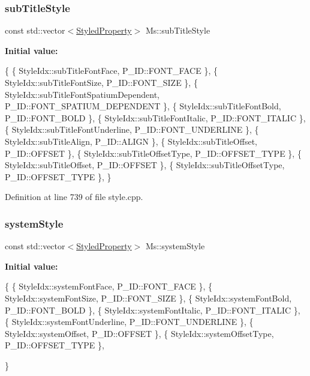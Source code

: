 \subsubsection{\texorpdfstring{sub\+Title\+Style}{subTitleStyle}}
{\footnotesize\ttfamily const std\+::vector$<$\hyperlink{struct_ms_1_1_styled_property}{Styled\+Property}$>$ Ms\+::sub\+Title\+Style}

{\bfseries Initial value\+:}
\begin{DoxyCode}
\{
      \{ StyleIdx::subTitleFontFace,                   P\_ID::FONT\_FACE              \},
      \{ StyleIdx::subTitleFontSize,                   P\_ID::FONT\_SIZE              \},
      \{ StyleIdx::subTitleFontSpatiumDependent,       P\_ID::FONT\_SPATIUM\_DEPENDENT \},
      \{ StyleIdx::subTitleFontBold,                   P\_ID::FONT\_BOLD              \},
      \{ StyleIdx::subTitleFontItalic,                 P\_ID::FONT\_ITALIC            \},
      \{ StyleIdx::subTitleFontUnderline,              P\_ID::FONT\_UNDERLINE         \},
      \{ StyleIdx::subTitleAlign,                      P\_ID::ALIGN                  \},
      \{ StyleIdx::subTitleOffset,                     P\_ID::OFFSET                 \},
      \{ StyleIdx::subTitleOffsetType,                 P\_ID::OFFSET\_TYPE            \},
      \{ StyleIdx::subTitleOffset,                     P\_ID::OFFSET                 \},
      \{ StyleIdx::subTitleOffsetType,                 P\_ID::OFFSET\_TYPE            \},
      \}
\end{DoxyCode}


Definition at line 739 of file style.\+cpp.

\mbox{\label{namespace_ms_ae95a2fb33de7c7c3a3590990894e5e71}} 
\subsubsection{\texorpdfstring{system\+Style}{systemStyle}}
{\footnotesize\ttfamily const std\+::vector$<$\hyperlink{struct_ms_1_1_styled_property}{Styled\+Property}$>$ Ms\+::system\+Style}

{\bfseries Initial value\+:}
\begin{DoxyCode}
\{
      \{ StyleIdx::systemFontFace,                     P\_ID::FONT\_FACE              \},
      \{ StyleIdx::systemFontSize,                     P\_ID::FONT\_SIZE              \},
      \{ StyleIdx::systemFontBold,                     P\_ID::FONT\_BOLD              \},
      \{ StyleIdx::systemFontItalic,                   P\_ID::FONT\_ITALIC            \},
      \{ StyleIdx::systemFontUnderline,                P\_ID::FONT\_UNDERLINE         \},
      \{ StyleIdx::systemOffset,                       P\_ID::OFFSET                 \},
      \{ StyleIdx::systemOffsetType,                   P\_ID::OFFSET\_TYPE            \},

      \}
\end{DoxyCode}


